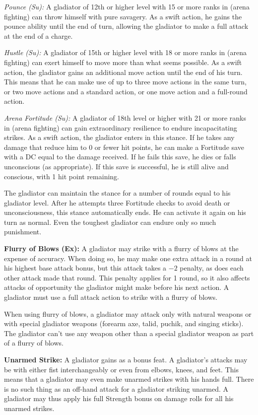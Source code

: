 \textit{Pounce (Su):} A gladiator of 12th or higher level with 15 or more ranks in  (arena fighting) can throw himself with pure savagery. As a swift action, he gains the pounce ability until the end of turn, allowing the gladiator to make a full attack at the end of a charge.

\textit{Hustle (Su):} A gladiator of 15th or higher level with 18 or more ranks in  (arena fighting) can exert himself to move more than what seems possible. As a swift action, the gladiator gains an additional move action until the end of his turn. This means that he can make use of up to three move actions in the same turn, or two move actions and a standard action, or one move action and a full-round action.

\textit{Arena Fortitude (Su):} A gladiator of 18th level or higher with 21 or more ranks in  (arena fighting) can gain extraordinary resilience to endure incapacitating strikes. As a swift action, the gladiator enters in this stance. If he takes any damage that reduce him to 0 or fewer hit points, he can make a Fortitude save with a DC equal to the damage received. If he fails this save, he dies or falls unconscious (as appropriate). If this save is successful, he is still alive and conscious, with 1 hit point remaining.

The gladiator can maintain the stance for a number of rounds equal to his gladiator level. After he attempts three Fortitude checks to avoid death or unconsciousness, this stance automatically ends. He can activate it again on his turn as normal. Even the toughest gladiator can endure only so much punishment.

\textbf{Flurry of Blows (Ex):} A gladiator may strike with a flurry of blows at the expense of accuracy. When doing so, he may make one extra attack in a round at his highest base attack bonus, but this attack takes a $-2$ penalty, as does each other attack made that round. This penalty applies for 1 round, so it also affects attacks of opportunity the gladiator might make before his next action. A gladiator must use a full attack action to strike with a flurry of blows.

When using flurry of blows, a gladiator may attack only with natural weapons or with special gladiator weapons (forearm axe, talid, puchik, and singing sticks). The gladiator can't use any weapon other than a special gladiator weapon as part of a flurry of blows.

\textbf{Unarmed Strike:} A gladiator gains  as a bonus feat. A gladiator's attacks may be with either fist interchangeably or even from elbows, knees, and feet. This means that a gladiator may even make unarmed strikes with his hands full. There is no such thing as an off-hand attack for a gladiator striking unarmed. A gladiator may thus apply his full Strength bonus on damage rolls for all his unarmed strikes.

